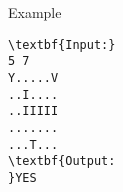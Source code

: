Example
\begin{verbatim}
\textbf{Input:}
5 7
Y.....V
..I....
..IIIII
.......
...T...
\textbf{Output:
}YES\end{verbatim}